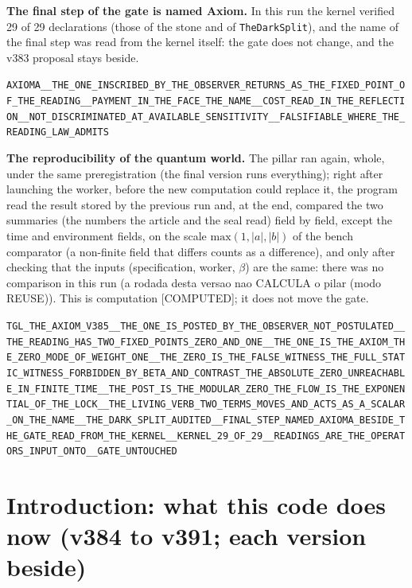 \documentclass[11pt]{article}
\theoremstyle{definition}\newtheorem{deriv}{Derivation}
\begin{document}
\textbf{The final step of the gate is named Axiom.} In this run the kernel verified 29 of 29 declarations (those of the stone and of \texttt{TheDarkSplit}), and the name of the final step was read from the kernel itself: the gate does not change, and the v383 proposal stays beside.

\begin{center}\small\texttt{AXIOMA\_\_THE\_ONE\_INSCRIBED\_BY\_THE\_OBSERVER\_RETURNS\_AS\_THE\_FIXED\_POINT\_OF\_THE\_READING\_\_PAYMENT\_IN\_THE\_FACE\_THE\_NAME\_\_COST\_READ\_IN\_THE\_REFLECTION\_\_NOT\_DISCRIMINATED\_AT\_AVAILABLE\_SENSITIVITY\_\_FALSIFIABLE\_WHERE\_THE\_READING\_LAW\_ADMITS}\end{center}

\textbf{The reproducibility of the quantum world.} The pillar ran again, whole, under the same preregistration (the final version runs everything); right after launching the worker, before the new computation could replace it, the program read the result stored by the previous run and, at the end, compared the two summaries (the numbers the article and the seal read) field by field, except the time and environment fields, on the scale $\mathrm{max}(1,|a|,|b|)$ of the bench comparator (a non-finite field that differs counts as a difference), and only after checking that the inputs (specification, worker, $\beta$) are the same: there was no comparison in this run (a rodada desta versao nao CALCULA o pilar (modo REUSE)). This is computation \textsf{[COMPUTED]}; it does not move the gate.

\begin{center}\small\texttt{TGL\_THE\_AXIOM\_V385\_\_THE\_ONE\_IS\_POSTED\_BY\_THE\_OBSERVER\_NOT\_POSTULATED\_\_THE\_READING\_HAS\_TWO\_FIXED\_POINTS\_ZERO\_AND\_ONE\_\_THE\_ONE\_IS\_THE\_AXIOM\_THE\_ZERO\_MODE\_OF\_WEIGHT\_ONE\_\_THE\_ZERO\_IS\_THE\_FALSE\_WITNESS\_THE\_FULL\_STATIC\_WITNESS\_FORBIDDEN\_BY\_BETA\_AND\_CONTRAST\_THE\_ABSOLUTE\_ZERO\_UNREACHABLE\_IN\_FINITE\_TIME\_\_THE\_POST\_IS\_THE\_MODULAR\_ZERO\_THE\_FLOW\_IS\_THE\_EXPONENTIAL\_OF\_THE\_LOCK\_\_THE\_LIVING\_VERB\_TWO\_TERMS\_MOVES\_AND\_ACTS\_AS\_A\_SCALAR\_ON\_THE\_NAME\_\_THE\_DARK\_SPLIT\_AUDITED\_\_FINAL\_STEP\_NAMED\_AXIOMA\_BESIDE\_THE\_GATE\_READ\_FROM\_THE\_KERNEL\_\_KERNEL\_29\_OF\_29\_\_READINGS\_ARE\_THE\_OPERATORS\_INPUT\_ONTO\_\_GATE\_UNTOUCHED}\end{center}

\section*{Introduction: what this code does now (v384 to v391; each version beside)}
\end{document}
